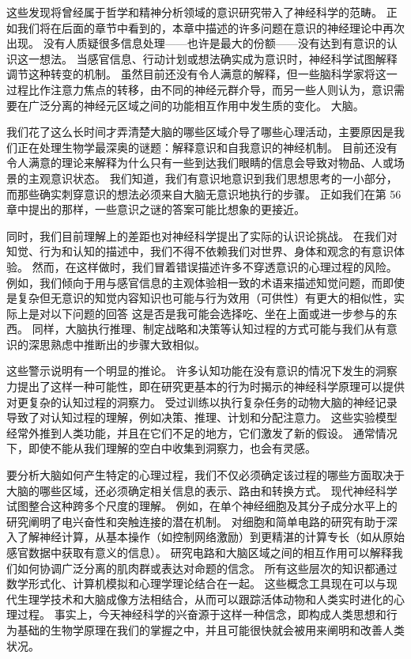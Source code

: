 这些发现将曾经属于哲学和精神分析领域的意识研究带入了神经科学的范畴。 正如我们将在后面的章节中看到的，本章中描述的许多问题在意识的神经理论中再次出现。 没有人质疑很多信息处理——也许是最大的份额——没有达到有意识的认识这一想法。 当感官信息、行动计划或想法确实成为意识时，神经科学试图解释调节这种转变的机制。 虽然目前还没有令人满意的解释，但一些脑科学家将这一过程比作注意力焦点的转移，由不同的神经元群介导，而另一些人则认为，意识需要在广泛分离的神经元区域之间的功能相互作用中发生质的变化。 大脑。

我们花了这么长时间才弄清楚大脑的哪些区域介导了哪些心理活动，主要原因是我们正在处理生物学最深奥的谜题：解释意识和自我意识的神经机制。 目前还没有令人满意的理论来解释为什么只有一些到达我们眼睛的信息会导致对物品、人或场景的主观意识状态。 我们知道，我们有意识地意识到我们思想思考的一小部分，而那些确实刺穿意识的想法必须来自大脑无意识地执行的步骤。 正如我们在第 56 章中提出的那样，一些意识之谜的答案可能比想象的更接近。

同时，我们目前理解上的差距也对神经科学提出了实际的认识论挑战。 在我们对知觉、行为和认知的描述中，我们不得不依赖我们对世界、身体和观念的有意识体验。 然而，在这样做时，我们冒着错误描述许多不穿透意识的心理过程的风险。 例如，我们倾向于用与感官信息的主观体验相一致的术语来描述知觉问题，而即使是复杂但无意识的知觉内容知识也可能与行为效用（可供性）有更大的相似性，实际上是对以下问题的回答 这是否是我可能会选择吃、坐在上面或进一步参与的东西。 同样，大脑执行推理、制定战略和决策等认知过程的方式可能与我们从有意识的深思熟虑中推断出的步骤大致相似。

这些警示说明有一个明显的推论。 许多认知功能在没有意识的情况下发生的洞察力提出了这样一种可能性，即在研究更基本的行为时揭示的神经科学原理可以提供对更复杂的认知过程的洞察力。 受过训练以执行复杂任务的动物大脑的神经记录导致了对认知过程的理解，例如决策、推理、计划和分配注意力。 这些实验模型经常外推到人类功能，并且在它们不足的地方，它们激发了新的假设。 通常情况下，即使不能从我们理解的空白中收集到洞察力，也会有灵感。

要分析大脑如何产生特定的心理过程，我们不仅必须确定该过程的哪些方面取决于大脑的哪些区域，还必须确定相关信息的表示、路由和转换方式。 现代神经科学试图整合这种跨多个尺度的理解。 例如，在单个神经细胞及其分子成分水平上的研究阐明了电兴奋性和突触连接的潜在机制。 对细胞和简单电路的研究有助于深入了解神经计算，从基本操作（如控制网络激励）到更精湛的计算专长（如从原始感官数据中获取有意义的信息）。 研究电路和大脑区域之间的相互作用可以解释我们如何协调广泛分离的肌肉群或表达对命题的信念。 所有这些层次的知识都通过数学形式化、计算机模拟和心理学理论结合在一起。 这些概念工具现在可以与现代生理学技术和大脑成像方法相结合，从而可以跟踪活体动物和人类实时进化的心理过程。 事实上，今天神经科学的兴奋源于这样一种信念，即构成人类思想和行为基础的生物学原理在我们的掌握之中，并且可能很快就会被用来阐明和改善人类状况。




